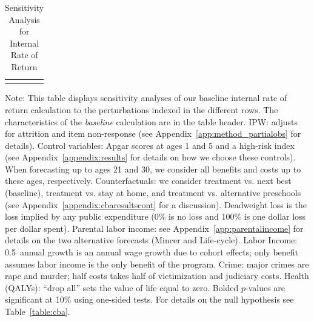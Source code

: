 \begin{table}
\begin{threeparttable}
\caption{Sensitivity Analysis for Internal Rate of Return}
\label{table:irrsens}
\centering
\scriptsize
\begin{tabularx}{22.5cm}{XcX}
&  & \end{tabularx}
\begin{tablenotes}
\footnotesize
\item Note: This table displays sensitivity analyses of our baseline internal rate of return calculation to the perturbations indexed in the different rows. The characteristics of the \textit{baseline} calculation are in the table header. IPW: adjusts for attrition and item non-response (see  Appendix~\ref{app:method_partialobs} for details). Control variables: Apgar scores at ages 1 and 5 and a high-risk index (see  Appendix~\ref{appendix:results} for details on how we choose these controls). When forecasting up to ages 21 and 30, we consider all benefits and costs up to these ages, respectively. Counterfactuals: we consider treatment vs. next best (baseline), treatment vs. stay at home, and treatment vs. alternative preschools (see Appendix~\ref{appendix:cbaresultscont} for a discussion). Deadweight loss is the loss implied by any public expenditure (0\% is no loss and 100\% is one dollar loss per dollar spent). Parental labor income: see  Appendix~\ref{app:parentalincome} for details on the two alternative forecasts (Mincer and Life-cycle). Labor Income: 0.5\ annual growth is an annual wage growth due to cohort effects; only benefit assumes labor income is the only benefit of the program. Crime: major crimes are rape and murder; half costs takes half of victimization and judiciary costs. Health (QALYs): ``drop all'' sets the value of life equal to zero. Bolded $p$-values are significant at 10\% using one-sided tests. For details on the null hypothesis see Table~\ref{table:cba}.
\end{tablenotes}
\end{threeparttable}
\end{table}

